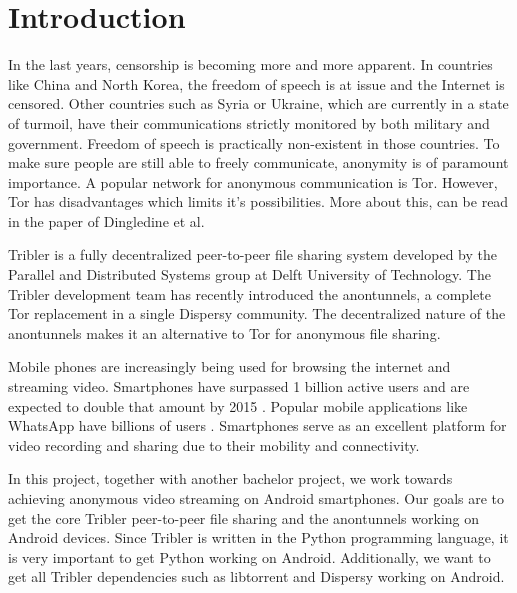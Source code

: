 
\chapter{Introduction}
In the last years, censorship is becoming more and more apparent. In countries like China and North Korea, the freedom of speech is at issue and the Internet is censored. Other countries such as Syria or Ukraine, which are currently in a state of turmoil, have their communications strictly monitored by both military and government. Freedom of speech is practically non-existent in those countries. To make sure people are still able to freely communicate, anonymity is of paramount importance. A popular network for anonymous communication is Tor. However, Tor has disadvantages which limits it's possibilities. More about this, can be read in the paper of Dingledine et al. \cite{dingledine2009performance}

Tribler is a fully decentralized peer-to-peer file sharing system developed by the Parallel and Distributed Systems group at Delft University of Technology. The Tribler development team has recently introduced the anontunnels, a complete Tor replacement in a single Dispersy community. The decentralized nature of the anontunnels makes it an alternative to Tor for anonymous file sharing.

Mobile phones are increasingly being used for browsing the internet and streaming video. Smartphones have surpassed 1 billion active users and are expected to double that amount by 2015 \cite{yang2015smartphones}. Popular mobile applications like WhatsApp have billions of users \cite{googleplayinstagram, googleplaywhatsapp}. Smartphones serve as an excellent platform for video recording and sharing due to their mobility and connectivity.

In this project, together with another bachelor project, we work towards achieving anonymous video streaming on Android smartphones. Our goals are to get the core Tribler peer-to-peer file sharing and the anontunnels working on Android devices. Since Tribler is written in the Python programming language, it is very important to get Python working on Android. Additionally, we want to get all Tribler dependencies such as libtorrent and Dispersy working on Android.

